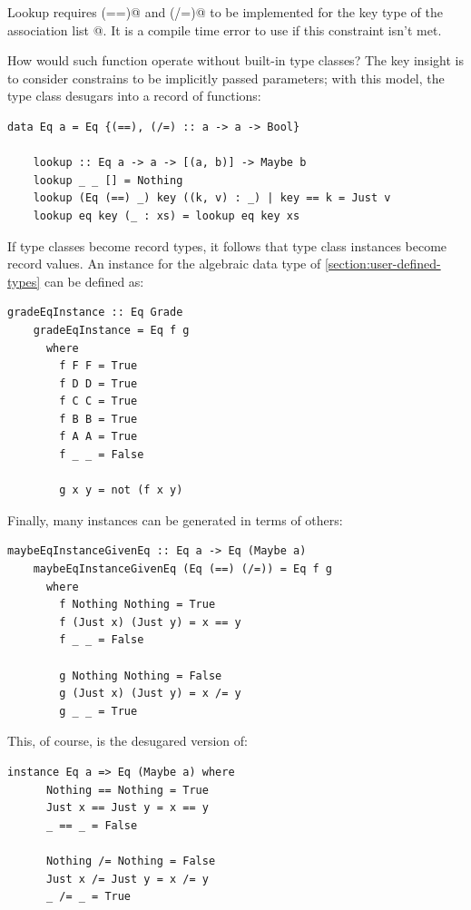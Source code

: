 \documentclass[UdineBachThesis,american,11pt]{PhdThesis}
\begin{document}
  Lookup requires \lstinline@(==)@ and \lstinline@(/=)@ to be implemented for
  the key type \lstinline@a@ of the association list \lstinline@[(a, b)]@. It is
  a compile time error to use \lstinline@lookup@ if this constraint isn't met.

  How would such function operate without built-in type classes? The key insight
  is to consider constrains to be implicitly passed parameters; with this model,
  the \lstinline@Eq@ type class desugars into a record of functions:

  \begin{lstlisting}[gobble=4,basicstyle=\ttfamily\small]
    data Eq a = Eq {(==), (/=) :: a -> a -> Bool}

    lookup :: Eq a -> a -> [(a, b)] -> Maybe b
    lookup _ _ [] = Nothing
    lookup (Eq (==) _) key ((k, v) : _) | key == k = Just v
    lookup eq key (_ : xs) = lookup eq key xs
  \end{lstlisting}

  If type classes become record types, it follows that type class instances
  become record values. An \lstinline@Eq@ instance for the algebraic data type
  \lstinline@Grade@ of \autoref{section:user-defined-types} can be defined as:

  \begin{lstlisting}[gobble=4,basicstyle=\ttfamily\small]
    gradeEqInstance :: Eq Grade
    gradeEqInstance = Eq f g
      where
        f F F = True
        f D D = True
        f C C = True
        f B B = True
        f A A = True
        f _ _ = False

        g x y = not (f x y)
  \end{lstlisting}

  \newpage

  Finally, many instances can be generated in terms of others:

  \begin{lstlisting}[gobble=4,basicstyle=\ttfamily\small]
    maybeEqInstanceGivenEq :: Eq a -> Eq (Maybe a)
    maybeEqInstanceGivenEq (Eq (==) (/=)) = Eq f g
      where
        f Nothing Nothing = True
        f (Just x) (Just y) = x == y
        f _ _ = False

        g Nothing Nothing = False
        g (Just x) (Just y) = x /= y
        g _ _ = True
  \end{lstlisting}

  This, of course, is the desugared version of:

  \begin{lstlisting}[gobble=4,basicstyle=\ttfamily\small]
    instance Eq a => Eq (Maybe a) where
      Nothing == Nothing = True
      Just x == Just y = x == y
      _ == _ = False

      Nothing /= Nothing = False
      Just x /= Just y = x /= y
      _ /= _ = True
  \end{lstlisting}
\end{document}

